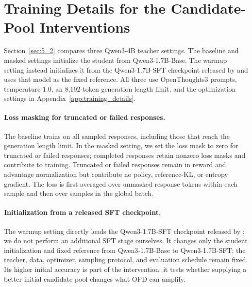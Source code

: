 

\FloatBarrier



\FloatBarrier

\section{Training Details for the Candidate-Pool Interventions}
\label{app:intervention_details}

Section~\ref{sec:5_2} compares three Qwen3-4B teacher settings. The baseline
and masked settings initialize the student from Qwen3-1.7B-Base. The warmup
setting instead initializes it from the Qwen3-1.7B-SFT checkpoint released by
\citet{li2026rethinkingopd} and uses that model as the fixed reference.
All three use OpenThoughts3 prompts, temperature $1.0$, an
8,192-token generation length limit, and the optimization settings in
Appendix~\ref{app:training_details}.

\paragraph{Loss masking for truncated or failed responses.}
The baseline trains on all sampled responses, including those that reach the
generation length limit. In the masked setting, we set the loss mask to zero
for truncated or failed responses; completed responses retain nonzero loss
masks and contribute to training. Truncated or failed responses remain in reward and
advantage normalization but contribute no policy, reference-KL, or entropy
gradient. The loss is first averaged over unmasked response tokens within
each sample and then over samples in the global batch.


\paragraph{Initialization from a released SFT checkpoint.}
The warmup setting directly loads the Qwen3-1.7B-SFT checkpoint released by
\citet{li2026rethinkingopd}; we do not perform an additional SFT stage ourselves.
It changes only the student initialization and fixed reference
from Qwen3-1.7B-Base to Qwen3-1.7B-SFT; the teacher, data, optimizer, sampling
protocol, and evaluation schedule remain fixed. Its higher initial accuracy
is part of the intervention: it tests whether supplying a better initial
candidate pool changes what OPD can amplify.

\FloatBarrier
